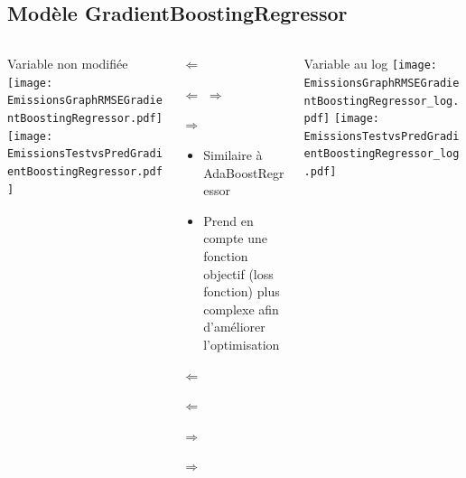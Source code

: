 \documentclass[8pt,aspectratio=169,hyperref={unicode=true}]{beamer}
\begin{document}
\subsection{Modèle GradientBoostingRegressor}
\begin{frame}{\insertsubsection}
  \begin{columns}[t]
    \begin{column}{.33\textwidth}
      \centering Variable non modifiée
      \texttt{[image: EmissionsGraphRMSEGradientBoostingRegressor.pdf]}
      \texttt{[image: EmissionsTestvsPredGradientBoostingRegressor.pdf]}
    \end{column}
    \begin{column}{.33\textwidth}
      $\Longleftarrow$

      {\footnotesize
      }

      $\Longleftarrow$ \hfill $\Longrightarrow$
      
      \raggedleft
      {\footnotesize 
      }

      $\Longrightarrow$

      \raggedright
      \begin{itemize}
        \item Similaire à AdaBoostRegressor
        \item Prend en compte une fonction objectif (loss fonction) plus complexe afin
              d'améliorer l'optimisation
      \end{itemize}

      $\Longleftarrow$
      {\scriptsize \centering
          }

      $\Longleftarrow$

      \raggedleft
      $\Longrightarrow$

      {\scriptsize \centering
          
        }
      \raggedleft
      $\Longrightarrow$
    \end{column}
    \begin{column}{.33\textwidth}
      \centering Variable au log
      \texttt{[image: EmissionsGraphRMSEGradientBoostingRegressor\_log.pdf]}
      \texttt{[image: EmissionsTestvsPredGradientBoostingRegressor\_log.pdf]}
    \end{column}
  \end{columns}
\end{frame}
\end{document}
